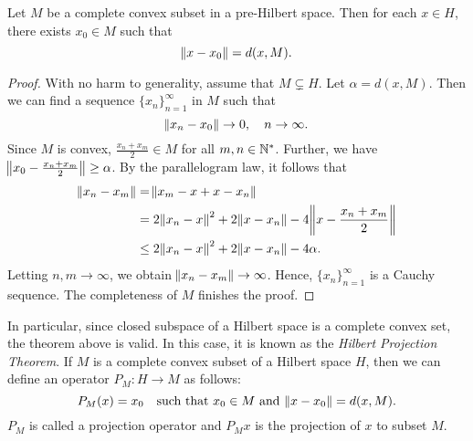 \begin{thm}
\label{thm:hilbert_spaces:projection_theorem}
Let $M$ be a complete convex subset in a pre-Hilbert space. 
Then for each $x \in H$, there exists $x_0 \in M$ such that 
\begin{equation*}
    \norm{x - x_0} = d(x, M). 
\end{equation*}
\end{thm}
\begin{proof}
With no harm to generality, assume that $M \subsetneq H$. 
Let $\alpha = d(x, M)$. 
Then we can find a sequence $\{ x_n \}_{n=1}^{\infty}$ in $M$ such that 
\begin{equation*}
    \norm{x_n - x_0} \to 0, \quad n \to \infty. 
\end{equation*}
Since $M$ is convex, $\frac{x_n + x_m}{2} \in M$ for all $m, n \in \mathbb{N}^\ast$. 
Further, we have $\norm{x_0 - \frac{x_n + x_m}{2}} \ge \alpha$. 
By the parallelogram law, it follows that 
\begin{equation*}
    \begin{aligned}
        \norm{x_n - x_m} &= \norm{x_m - x + x - x_n} \\
        &= 2\norm{x_n - x}^2 + 2 \norm{x - x_n} 
            - 4 \norm{x - \frac{x_n + x_m}{2}} \\
        &\le 2\norm{x_n - x}^2 + 2 \norm{x - x_n} 
            - 4 \alpha.
    \end{aligned}
\end{equation*}
Letting $n, m \to \infty$, we obtain $\norm{x_n - x_m} \to \infty$. 
Hence, $\{ x_n \}_{n=1}^{\infty}$ is a Cauchy sequence. 
The completeness of $M$ finishes the proof. 
\end{proof}

In particular, since closed subspace of a Hilbert space is a complete convex 
set, the theorem above is valid. 
In this case, it is known as the \emph{Hilbert Projection Theorem}. 
If $M$ is a complete convex subset of a Hilbert space $H$, then we can 
define an operator $P_M: H \to M$ as follows: 
\begin{equation*}
    P_M(x) = x_0 \quad \text{such that } x_0 \in M \text{ and } 
    \norm{x - x_0} = d(x, M).
\end{equation*}
$P_M$ is called a projection operator and $P_Mx$ is the projection of $x$ 
to subset $M$. 

